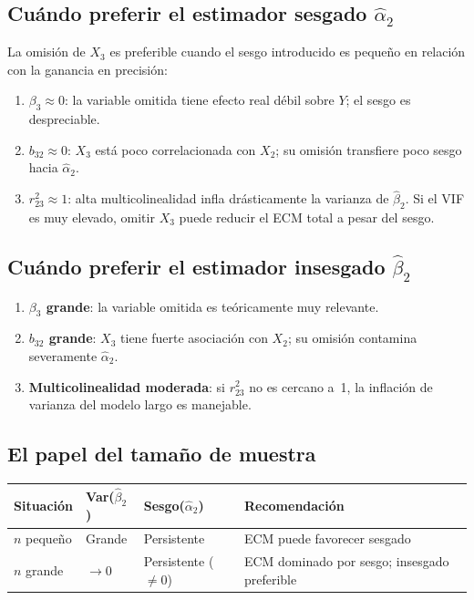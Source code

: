 \documentclass[12pt, letterpaper]{article}
\begin{document}
\subsection{Cuándo preferir el estimador sesgado $\hat{\alpha}_2$}

La omisión de $X_3$ es preferible cuando el sesgo introducido es pequeño en
relación con la ganancia en precisión:

\begin{enumerate}[leftmargin=1.8em]
  \item \textbf{$\beta_3 \approx 0$}: la variable omitida tiene efecto real
    débil sobre $Y$; el sesgo es despreciable.
  \item \textbf{$b_{32} \approx 0$}: $X_3$ está poco correlacionada con $X_2$;
    su omisión transfiere poco sesgo hacia $\hat{\alpha}_2$.
  \item \textbf{$r_{23}^2 \approx 1$}: alta multicolinealidad infla
    drásticamente la varianza de $\hat{\beta}_2$. Si el VIF es muy elevado,
    omitir $X_3$ puede reducir el ECM total a pesar del sesgo.
\end{enumerate}

\subsection{Cuándo preferir el estimador insesgado $\hat{\beta}_2$}

\begin{enumerate}[leftmargin=1.8em]
  \item \textbf{$\beta_3$ grande}: la variable omitida es teóricamente muy
    relevante.
  \item \textbf{$b_{32}$ grande}: $X_3$ tiene fuerte asociación con $X_2$;
    su omisión contamina severamente $\hat{\alpha}_2$.
  \item \textbf{Multicolinealidad moderada}: si $r_{23}^2$ no es cercano a~1,
    la inflación de varianza del modelo largo es manejable.
\end{enumerate}

\subsection{El papel del tamaño de muestra}

\begin{center}
\renewcommand{\arraystretch}{1.3}
\small
\begin{tabular}{p{2.2cm}p{3.2cm}p{3.2cm}p{4.8cm}}
\toprule
\textbf{Situación} & \textbf{Var($\hat{\beta}_2$)} &
\textbf{Sesgo($\hat{\alpha}_2$)} & \textbf{Recomendación} \\
\midrule
$n$ pequeño & Grande & Persistente & ECM puede favorecer sesgado \\
$n$ grande  & $\to 0$ & Persistente ($\neq 0$) &
  ECM dominado por sesgo; insesgado preferible \\
\bottomrule
\end{tabular}
\end{center}
\end{document}
